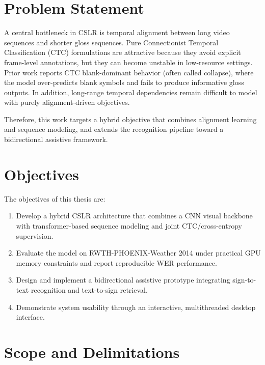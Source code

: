 \section{Problem Statement}

A central bottleneck in CSLR is temporal alignment between long video sequences and shorter gloss sequences. Pure Connectionist Temporal Classification (CTC) formulations are attractive because they avoid explicit frame-level annotations, but they can become unstable in low-resource settings. Prior work reports CTC blank-dominant behavior (often called collapse), where the model over-predicts blank symbols and fails to produce informative gloss outputs.\cite{graves2006connectionist} In addition, long-range temporal dependencies remain difficult to model with purely alignment-driven objectives.

Therefore, this work targets a hybrid objective that combines alignment learning and sequence modeling, and extends the recognition pipeline toward a bidirectional assistive framework.

\section{Objectives}

The objectives of this thesis are:
\begin{enumerate}
    \item Develop a hybrid CSLR architecture that combines a CNN visual backbone with transformer-based sequence modeling and joint CTC/cross-entropy supervision.
    \item Evaluate the model on RWTH-PHOENIX-Weather 2014 under practical GPU memory constraints and report reproducible WER performance.
    \item Design and implement a bidirectional assistive prototype integrating sign-to-text recognition and text-to-sign retrieval.
    \item Demonstrate system usability through an interactive, multithreaded desktop interface.
\end{enumerate}

\section{Scope and Delimitations}

